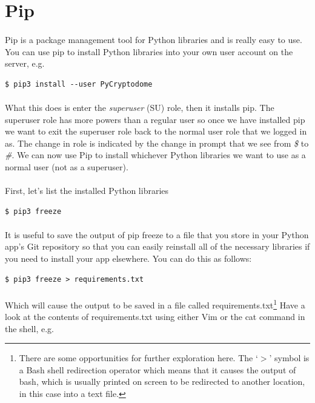 \documentclass[12pt, a4paper, oneside]{book}
\begin{document}
{\section{Pip}
\label{pip}
\paragraph{} Pip is a package management tool for Python libraries and is really easy to use. You can use pip to install Python libraries into your own user account on the server, e.g.
\begin{lstlisting}[style=DOS]
    $ pip3 install --user PyCryptodome
\end{lstlisting}

\paragraph{} What this does is enter the \emph{superuser} (SU) role, then it installs pip. The superuser role has more powers than a regular user so once we have installed pip we want to exit the superuser role back to the normal user role that we logged in as. The change in role is indicated by the change in prompt that we see from \emph{\$} to \emph{\#}. We can now use Pip to install whichever Python libraries we want to use as a normal user (not as a superuser). 

\paragraph{} First, let's list the installed Python libraries

\begin{lstlisting}[style=DOS]
    $ pip3 freeze
\end{lstlisting}

\paragraph{} It is useful to save the output of pip freeze to a file that you store in your Python app's Git repository so that you can easily reinstall all of the necessary libraries if you need to install your app elsewhere. You can do this as follows:

\begin{lstlisting}[style=DOS]
    $ pip3 freeze > requirements.txt
\end{lstlisting}

\paragraph{} Which will cause the output to be saved in a file called requirements.txt\footnote{There are some opportunities for further exploration here. The `$>$' symbol is a Bash shell redirection operator which means that it causes the output of bash, which is usually printed on screen to be redirected to another location, in this case into a text file.} Have a look at the contents of requirements.txt using either Vim or the cat command in the shell, e.g.

}
\end{document}
